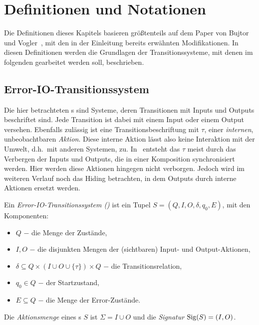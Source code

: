 \chapter{Definitionen und Notationen}

Die Definitionen dieses Kapitels basieren größtenteils auf dem Paper von Bujtor
und Vogler~\cite{Vogler2014EIO}, mit den in der Einleitung bereits erwähnten
Modifikationen. In diesen
Definitionen werden die Grundlagen der Transitionssysteme, mit denen im
folgenden gearbeitet werden soll, beschrieben.

\section{Error-IO-Transitionssystem}
Die hier betrachteten \EIO{}s sind Systeme, deren Transitionen mit Inputs und
Outputs beschriftet sind. Jede Transition ist dabei mit einem Input oder einem
Output versehen. Ebenfalls zulässig ist eine Transitionsbeschriftung mit
$\tau$, einer \emph{internen}, unbeobachtbaren \emph{Aktion}. Diese interne
Aktion lässt also keine Interaktion mit der Umwelt, d.h.\ mit anderen Systemen,
zu. In~\cite{Vogler2014EIO} entsteht das $\tau$ meist durch das
Verbergen der Inputs und Outputs, die in einer Komposition synchronisiert
werden. Hier werden diese Aktionen hingegen nicht verborgen. Jedoch wird im
weiteren Verlauf noch das Hiding betrachten, in dem Outputs durch interne
Aktionen ersetzt werden.

\begin{Def}
  Ein \emph{Error-IO-Transitionssystem \linebreak (\EIO{})} ist
  ein Tupel $S=(Q,I,O,\delta, q_0, E)$, mit den Komponenten:
  \begin{itemize}
    \item $Q$ $-$ die Menge der Zustände,
    \item $I,O$ $-$ die disjunkten Mengen der (sichtbaren) Input- und
      Output-Aktionen,
    \item $\delta\subseteq Q\times \left(I\cup O\cup\{\tau\}\right)\times Q$ $-$ die
      Transitionsrelation,
    \item $q_0\in Q$ $-$ der Startzustand,
    \item $E\subseteq Q$ $-$ die Menge der Error-Zustände.
  \end{itemize}
  Die \emph{Aktionsmenge} eines \EIO{}s $S$ ist $\Sigma = I\cup O$ und die
  \emph{Signatur} $\mathrm{Sig}(S)=(I,O)$.
\end{Def}

